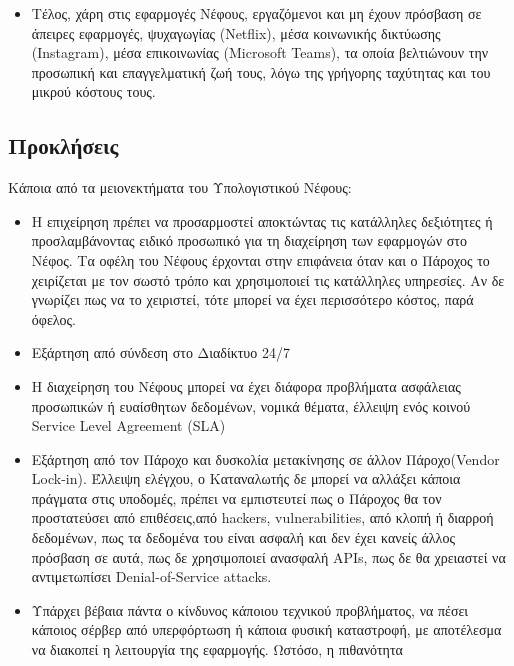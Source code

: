 \documentclass{article}
\begin{document}
\begin{itemize}
\item        Τέλος, χάρη στις εφαρμογές Νέφους, εργαζόμενοι και μη έχουν πρόσβαση
σε άπειρες εφαρμογές, ψυχαγωγίας (Netflix),
μέσα κοινωνικής δικτύωσης
(Instagram), μέσα
επικοινωνίας (Microsoft
Teams), τα οποία βελτιώνουν την προσωπική και
επαγγελματική ζωή τους, λόγω της γρήγορης ταχύτητας και του μικρού κόστους
τους.
\end{itemize}
\subsection{Προκλήσεις}
Κάποια από τα μειονεκτήματα του Υπολογιστικού Νέφους:
\begin{itemize}
\item        Η επιχείρηση πρέπει να προσαρμοστεί αποκτώντας τις κατάλληλες
δεξιότητες ή προσλαμβάνοντας ειδικό προσωπικό για τη διαχείρηση των
εφαρμογών στο Νέφος. Τα οφέλη του Νέφους έρχονται στην επιφάνεια όταν και
ο Πάροχος το χειρίζεται με τον σωστό τρόπο και χρησιμοποιεί τις κατάλληλες
υπηρεσίες. Αν δε γνωρίζει πως να το χειριστεί, τότε μπορεί να έχει
περισσότερο κόστος, παρά όφελος.
\item        Εξάρτηση από σύνδεση στο Διαδίκτυο 24/7
\item        Η διαχείρηση του Νέφους μπορεί να έχει διάφορα προβλήματα ασφάλειας
προσωπικών ή ευαίσθητων δεδομένων,  νομικά θέματα, έλλειψη ενός κοινού
Service Level Agreement
(SLA)
\item        Εξάρτηση από τον Πάροχο και δυσκολία μετακίνησης σε άλλον
Πάροχο(Vendor Lock-in). 
Έλλειψη ελέγχου, ο Καταναλωτής δε μπορεί να αλλάξει κάποια πράγματα στις
υποδομές, πρέπει να εμπιστευτεί πως ο Πάροχος θα τον προστατεύσει από
επιθέσεις,από hackers,
vulnerabilities, από κλοπή ή διαρροή δεδομένων, πως
τα δεδομένα του είναι ασφαλή και δεν έχει κανείς άλλος πρόσβαση σε αυτά,
πως δε χρησιμοποιεί ανασφαλή APIs,
πως δε θα χρειαστεί να αντιμετωπίσει
 Denial-of-Service attacks.
\item        Υπάρχει βέβαια πάντα ο κίνδυνος κάποιου τεχνικού προβλήματος, να
πέσει κάποιος σέρβερ από υπερφόρτωση ή κάποια φυσική καταστροφή, με
αποτέλεσμα να διακοπεί η λειτουργία της εφαρμογής. Ωστόσο, η πιθανότητα

\end{itemize}
\end{document}

